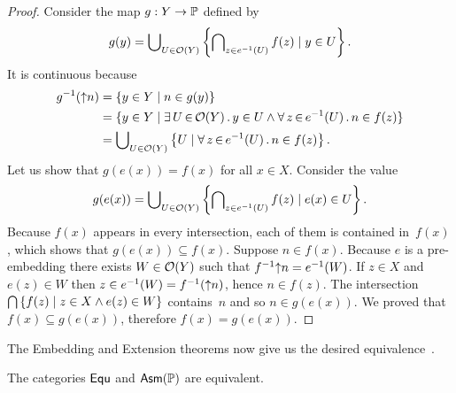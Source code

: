 \begin{proof}
  Consider the map $g : Y \to \mathbb{P}$ defined by
  \begin{equation*}
    g(y) = \bigcup\nolimits_{U \in \mathcal{O}(Y)} \left\{
      \bigcap\nolimits_{z \in e^{-1}(U)} f(z)
      \mid
      y \in U
    \right\}.
  \end{equation*}
  It is continuous because
  \begin{align*}
    \invim{g}(\upper{n}) &=
    \set{y \in Y \such n \in g(y)} \\
    &=
    \set{y \in Y \such \xsome{U}{
        \topol{Y}}{y \in U \land
        \xall{z}{\invim{e}(U)}{n \in f(z)}
      }
    } \\
    &=
    \tbigcup_{U \in \topol{Y}} \left\{
        U \such
        \xall{z}{\invim{e}(U)}{n \in f(z)}
      \right\}.
  \end{align*}
  Let us show that $g(e(x)) = f(x)$ for all $x \in X$. Consider the
  value
  \begin{align*}
    g(e(x)) =
    \bigcup\nolimits_{U \in \mathcal{O}(Y)} \left\{
      \bigcap\nolimits_{z \in e^{-1}(U)} f(z)
      \mid
      e(x) \in U \right\}.
  \end{align*}
  Because $f(x)$ appears in every intersection, each of them is
  contained in~$f(x)$, which shows that $g(e(x)) \subseteq f(x)$.
  Suppose $n \in f(x)$. Because $e$ is a pre-embedding there exists $W
  \in \mathcal{O}(Y)$ such that $f^{-1}{{\uparrow}n} = e^{-1}(W)$. If
  $z \in X$ and $e(z) \in W$ then $z \in e^{-1}(W) =
  f^{-1}({\uparrow}n)$, hence $n \in f(z)$. The intersection
  $\bigcap\nolimits \left\{f(z) \mid z \in X \land e(z) \in W \right\}$
  contains~$n$ and so $n \in g(e(x))$. We proved that $f(x) \subseteq
  g(e(x))$, therefore $f(x) = g(e(x))$.
\end{proof}

\noindent
%
The Embedding and Extension theorems now give us the desired
equivalence~\cite{Simpson-Menni}.

\begin{proposition}
  \label{prop:equ-equiv-asm-scott}%
  The categories $\mathsf{Equ}$ and $\mathsf{Asm}(\mathbb{P})$ are equivalent.
\end{proposition}

